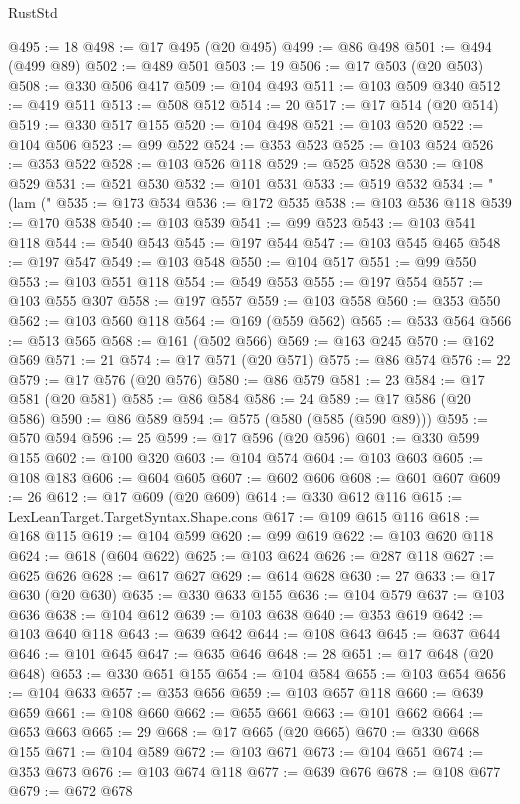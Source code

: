 \begin{lexlean}{RustStd}
\begin{coremodule}
@495 := 18
@498 := @17 @495 (@20 @495)
@499 := @86 @498
@501 := @494 (@499 @89)
@502 := @489 @501
@503 := 19
@506 := @17 @503 (@20 @503)
@508 := @330 @506 @417
@509 := @104 @493
@511 := @103 @509 @340
@512 := @419 @511
@513 := @508 @512
@514 := 20
@517 := @17 @514 (@20 @514)
@519 := @330 @517 @155
@520 := @104 @498
@521 := @103 @520
@522 := @104 @506
@523 := @99 @522
@524 := @353 @523
@525 := @103 @524
@526 := @353 @522
@528 := @103 @526 @118
@529 := @525 @528
@530 := @108 @529
@531 := @521 @530
@532 := @101 @531
@533 := @519 @532
@534 := "(lam ("
@535 := @173 @534
@536 := @172 @535
@538 := @103 @536 @118
@539 := @170 @538
@540 := @103 @539
@541 := @99 @523
@543 := @103 @541 @118
@544 := @540 @543
@545 := @197 @544
@547 := @103 @545 @465
@548 := @197 @547
@549 := @103 @548
@550 := @104 @517
@551 := @99 @550
@553 := @103 @551 @118
@554 := @549 @553
@555 := @197 @554
@557 := @103 @555 @307
@558 := @197 @557
@559 := @103 @558
@560 := @353 @550
@562 := @103 @560 @118
@564 := @169 (@559 @562)
@565 := @533 @564
@566 := @513 @565
@568 := @161 (@502 @566)
@569 := @163 @245
@570 := @162 @569
@571 := 21
@574 := @17 @571 (@20 @571)
@575 := @86 @574
@576 := 22
@579 := @17 @576 (@20 @576)
@580 := @86 @579
@581 := 23
@584 := @17 @581 (@20 @581)
@585 := @86 @584
@586 := 24
@589 := @17 @586 (@20 @586)
@590 := @86 @589
@594 := @575 (@580 (@585 (@590 @89)))
@595 := @570 @594
@596 := 25
@599 := @17 @596 (@20 @596)
@601 := @330 @599 @155
@602 := @100 @320
@603 := @104 @574
@604 := @103 @603
@605 := @108 @183
@606 := @604 @605
@607 := @602 @606
@608 := @601 @607
@609 := 26
@612 := @17 @609 (@20 @609)
@614 := @330 @612 @116
@615 := LexLeanTarget.TargetSyntax.Shape.cons
@617 := @109 @615 @116
@618 := @168 @115
@619 := @104 @599
@620 := @99 @619
@622 := @103 @620 @118
@624 := @618 (@604 @622)
@625 := @103 @624
@626 := @287 @118
@627 := @625 @626
@628 := @617 @627
@629 := @614 @628
@630 := 27
@633 := @17 @630 (@20 @630)
@635 := @330 @633 @155
@636 := @104 @579
@637 := @103 @636
@638 := @104 @612
@639 := @103 @638
@640 := @353 @619
@642 := @103 @640 @118
@643 := @639 @642
@644 := @108 @643
@645 := @637 @644
@646 := @101 @645
@647 := @635 @646
@648 := 28
@651 := @17 @648 (@20 @648)
@653 := @330 @651 @155
@654 := @104 @584
@655 := @103 @654
@656 := @104 @633
@657 := @353 @656
@659 := @103 @657 @118
@660 := @639 @659
@661 := @108 @660
@662 := @655 @661
@663 := @101 @662
@664 := @653 @663
@665 := 29
@668 := @17 @665 (@20 @665)
@670 := @330 @668 @155
@671 := @104 @589
@672 := @103 @671
@673 := @104 @651
@674 := @353 @673
@676 := @103 @674 @118
@677 := @639 @676
@678 := @108 @677
@679 := @672 @678

\end{coremodule}
\end{lexlean}
